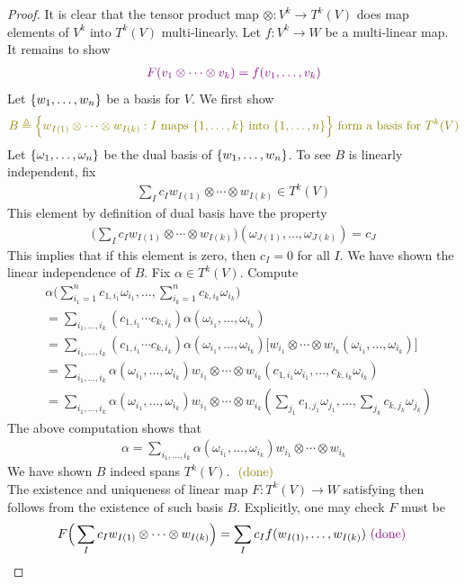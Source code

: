 \documentclass{report}
\begin{document}
\begin{proof}
It is clear that the tensor product map $\otimes  :V^k\rightarrow T^k(V)$ does map elements of $V^k$ into $T^k(V)$ multi-linearly. Let $f:V^k\rightarrow W$ be a multi-linear map. It remains to show 
\begin{align}
\label{vfv}
\textcolor{violet}{F(v_1\otimes  \cdots \otimes  v_k)=f(v_1,\dots ,v_k)}
\end{align}
Let $\{ w_1,\dots ,w_n \}$ be a basis for $V$. We first show 
\begin{align*}
  \olive{B\triangleq \bset{w_{I(1)}\otimes  \cdots \otimes  w_{I(k)}:I\text{ maps }\set{1,\dots ,k}\text{ into }\set{1,\dots ,n}}\text{ form a basis for }T^k(V)}
\end{align*}
Let $\{ \omega_1,\dots ,\omega_n \}$ be the dual basis of $\{ w_1,\dots ,w_n \}$. To see $B$ is linearly independent, fix 
\begin{align*}
\sum_{I}c_I w_{I(1)}\otimes  \cdots \otimes  w_{I(k)}\in T^k(V)
\end{align*}
This element by definition of dual basis have the property 
\begin{align*}
\Big(\sum_{I}c_I w_{I(1)}\otimes  \cdots \otimes  w_{I(k)} \Big) (\omega_{J(1)},\dots ,\omega_{J(k)})= c_J
\end{align*}
This implies that if this element is zero, then $c_I=0$ for all $I$. We have shown the linear independence of $B$. Fix $\alpha \in T^k(V)$. Compute 
\begin{align*}
&\alpha \Big(\sum_{i_1=1}^n c_{1,i_1}\omega_{i_1},\dots ,\sum_{i_k=1}^n c_{k,i_k}\omega_{i_k} \Big)\\
&=\sum_{i_1,\dots ,i_k} (c_{1,i_1}\cdots c_{k,i_k})\alpha (\omega_{i_1},\dots ,\omega_{i_k}) \\
&=\sum_{i_1,\dots ,i_k} (c_{1,i_1}\cdots c_{k,i_k})\alpha (\omega_{i_1},\dots ,\omega_{i_k}) \big[w_{i_1}\otimes  \cdots \otimes  w_{i_k}(\omega_{i_1},\dots ,\omega_{i_k}) \big] \\
&=\sum_{i_1,\dots ,i_k}\alpha (\omega_{i_1},\dots ,\omega_{i_k})w_{i_1}\otimes  \cdots \otimes  w_{i_k}(c_{1,i_1}\omega_{i_1},\dots ,c_{k,i_k}\omega_{i_k})\\
&=\sum_{i_1,\dots ,i_k}\alpha (\omega_{i_1},\dots ,\omega_{i_k})w_{i_1}\otimes  \cdots \otimes  w_{i_k}(\sum_{j_1}c_{1,j_1}\omega_{j_1},\dots ,\sum_{j_k}c_{k,j_k}\omega_{j_k})
\end{align*}
The above computation shows that 
\begin{align*}
\alpha = \sum_{i_1,\dots ,i_k}\alpha (\omega_{i_1},\dots , \omega_{i_k}) w_{i_1}\otimes  \cdots \otimes  w_{i_k}
\end{align*}
We have shown $B$ indeed spans  $T^k(V)$. $\odone$\\

The existence and uniqueness of linear map $F:T^k(V)\rightarrow W$ satisfying  then follows from the existence of such basis $B$. Explicitly, one may check  $F$ must be  
\begin{align*}
F\Big(\sum_{I}c_Iw_{I(1)}\otimes \cdots \otimes  w_{I(k)}\Big)= \sum_I c_I f(w_{I(1)},\dots ,w_{I(k)}) \textcolor{violet}{\text{ (done) }}
\end{align*}
\end{proof}
\end{document}
